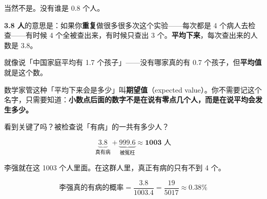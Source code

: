 \documentclass[12pt,a4paper]{article}
\begin{document}
\begin{warnbox}
当然不是。没有谁是 0.8 个人。

\textbf{3.8 人}的意思是：如果你\textbf{重复}做很多很多次这个实验——每次都是 4 个病人去检查——有时候 4 个全被查出来，有时候只查出 3 个。\textbf{平均下来}，每次查出来的人数是 3.8。

就像说「中国家庭平均有 1.7 个孩子」——没有哪家真的有 0.7 个孩子，但\textbf{平均值}就是这个数。

数学家管这种「平均下来会是多少」叫\textbf{期望值}（expected value）。你不需要记这个名字，只需要知道：\textbf{小数点后面的数字不是在说有零点几个人，而是在说平均会发生多少。}
\end{warnbox}

看到关键了吗？被检查说「有病」的一共有多少人？

$$\underbrace{3.8}_{\text{真有病}} + \underbrace{999.6}_{\text{被冤枉}} \approx \textbf{1003 人}$$

李强就在这 1003 个人里面。在这群人里，真正有病的只有不到 4 个。

$$\text{李强真的有病的概率} = \frac{3.8}{1003.4} = \frac{19}{5017} \approx 0.38\%$$
\end{document}
